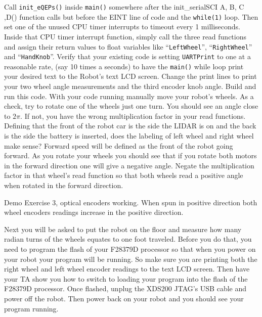 \documentclass[11pt]{article}
\begin{document}
Call \texttt{init_eQEPs()} inside \texttt{main()} somewhere after the init\_serialSCI A, B, C ,D() function calls but before the EINT line of code and the \texttt{while(1)} loop. Then set one of the unused CPU timer interrupts to timeout every 1 milliseconds. Inside that CPU timer interrupt function, simply call the three read functions and assign their return values to float variables like “\texttt{LeftWheel}”, “\texttt{RightWheel}” and “\texttt{HandKnob}”. Verify that your existing code is setting \texttt{UARTPrint} to one at a reasonable rate, (say 10 times a seconds) to have the \texttt{main()} while loop print your desired text to the Robot’s text LCD screen. Change the print lines to print your two wheel angle measurements and the third encoder knob angle. Build and run this code. With your code running manually move your robot’s wheels. As a check, try to rotate one of the wheels just one turn. You should see an angle close to $2\pi$. If not, you have the wrong multiplication factor in your read functions. Defining that the front of the robot car is the side the LIDAR is on and the back is the side the battery is inserted, does the labeling of left wheel and right wheel make sense? Forward speed will be defined as the front of the robot going forward. As you rotate your wheels you should see that if you rotate both motors in the forward direction one will give a negative angle. Negate the multiplication factor in that wheel’s read function so that both wheels read a positive angle when rotated in the forward direction.
%
\begin{checkoff}
        Demo Exercise 3, optical encoders working. When spun in positive direction both wheel encoders readings increase in the positive direction.
\end{checkoff}
%
Next you will be asked to put the robot on the floor and measure how many radian turns of the wheels equates to one foot traveled. Before you do that, you need to program the flash of your F28379D processor so that when you power on your robot your program will be running. So make sure you are printing both the right wheel and left wheel encoder readings to the text LCD screen. Then have your TA show you how to switch to loading your program into the flash of the F28379D processor. Once flashed, unplug the XDS200 JTAG’s USB cable and power off the robot. Then power back on your robot and you should see your program running.
\end{document}
